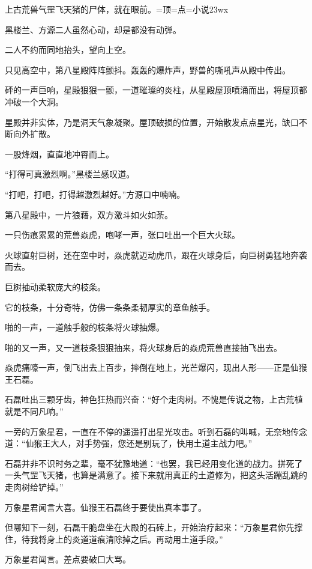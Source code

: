 
\begin{this_body}

上古荒兽气罡飞天猪的尸体，就在眼前。=顶=点=小说23wx

黑楼兰、方源二人虽然心动，却是都没有动弹。

二人不约而同地抬头，望向上空。

只见高空中，第八星殿阵阵颤抖。轰轰的爆炸声，野兽的嘶吼声从殿中传出。

砰的一声巨响，星殿狠狠一颤，一道璀璨的炎柱，从星殿屋顶喷涌而出，将屋顶都冲破一个大洞。

星殿并非实体，乃是洞天气象凝聚。屋顶破损的位置，开始散发点点星光，缺口不断向外扩散。

一股烽烟，直直地冲霄而上。

“打得可真激烈啊。”黑楼兰感叹道。

“打吧，打吧，打得越激烈越好。”方源口中喃喃。

第八星殿中，一片狼藉，双方激斗如火如荼。

一只伤痕累累的荒兽焱虎，咆哮一声，张口吐出一个巨大火球。

火球直射巨树，还在空中时，焱虎就迈动虎爪，跟在火球身后，向巨树勇猛地奔袭而去。

巨树抽动柔软庞大的枝条。

它的枝条，十分奇特，仿佛一条条柔韧厚实的章鱼触手。

啪的一声，一道触手般的枝条将火球抽爆。

啪的又一声，又一道枝条狠狠抽来，将火球身后的焱虎荒兽直接抽飞出去。

焱虎痛嚎一声，倒飞出去上百步，摔倒在地上，光芒爆闪，现出人形——正是仙猴王石磊。

石磊吐出三颗牙齿，神色狂热而兴奋：“好个走肉树。不愧是传说之物，上古荒植就是不同凡响。”

一旁的万象星君，一直在不停的遥遥打出星光攻击。听到石磊的叫喊，无奈地传念道：“仙猴王大人，对手势强，您还是别玩了，快用土道主战力吧。”

石磊并非不识时务之辈，毫不犹豫地道：“也罢，我已经用变化道的战力。拼死了一头气罡飞天猪，也算是满意了。接下来就用真正的土道修为，把这头活蹦乱跳的走肉树给铲掉。”

万象星君闻言大喜。仙猴王石磊终于要使出真本事了。

但哪知下一刻，石磊干脆盘坐在大殿的石砖上，开始治疗起来：“万象星君你先撑住，待我将身上的炎道道痕清除掉之后。再动用土道手段。”

万象星君闻言。差点要破口大骂。


\end{this_body}
